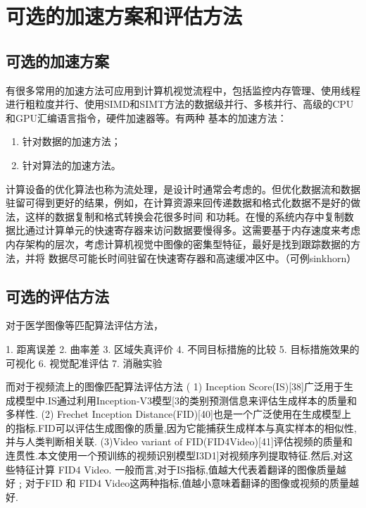 
\section{可选的加速方案和评估方法}

\subsection{可选的加速方案}

有很多常用的加速方法可应用到计算机视觉流程中，包括监控内存管理、使用线程进行粗粒度并行、使用SIMD和SIMT方法的数据级并行、多核并行、高级的CPU和GPU汇编语言指令，硬件加速器等。有两种
基本的加速方法：
\begin{enumerate}
    \item 针对数据的加速方法；
    \item 针对算法的加速方法。
\end{enumerate}

计算设备的优化算法也称为流处理，是设计时通常会考虑的。但优化数据流和数据驻留可得到更好的结果，例如，在计算资源来回传递数据和格式化数据不是好的做法，这样的数据复制和格式转换会花很多时间
和功耗。在慢的系统内存中复制数据比通过计算单元的快速寄存器来访问数据要慢得多。这需要基于内存速度来考虑内存架构的层次，考虑计算机视觉中图像的密集型特征，最好是找到跟踪数据的方法，并将
数据尽可能长时间驻留在快速寄存器和高速缓冲区中。（可例sinkhorn）

\subsection{可选的评估方法}

对于医学图像等匹配算法评估方法，

1. 距离误差
2. 曲率差
3. 区域失真评价
4. 不同目标措施的比较
5. 目标措施效果的可视化
6. 视觉配准评估
7. 消融实验

而对于视频流上的图像匹配算法评估方法
( 1) Inception Score(IS)[38]广泛用于生成模型中.IS通过利用Inception-V3模型[3的类别预测信息来评估生成样本的质量和多样性.
(2) Frechet Inception Distance(FID)[40]也是一个广泛使用在生成模型上的指标.FID可以评估生成图像的质量,因为它能捕获生成样本与真实样本的相似性,并与人类判断相关联.
(3)Video variant of FID(FID4Video)[41]评估视频的质量和连贯性.本文使用一个预训练的视频识别模型I3D1]对视频序列提取特征.然后,对这些特征计算 FID4 Video.
一般而言,对于IS指标,值越大代表着翻译的图像质量越好﹔对于FID 和 FID4 Video这两种指标,值越小意味着翻译的图像或视频的质量越好.
